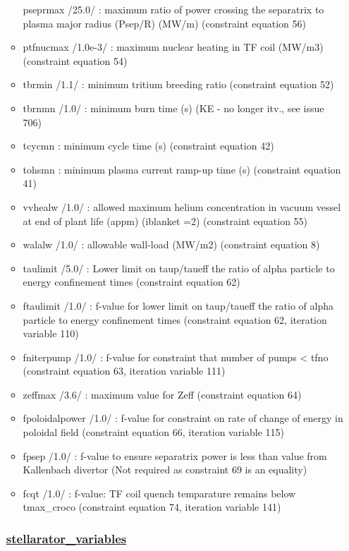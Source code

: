 \documentclass[]{article}
\begin{document}
\begin{itemize}
\begin{itemize}
    pseprmax /25.0/ : maximum ratio of power crossing the separatrix to
    plasma major radius (Psep/R) (MW/m) (constraint equation 56)
  \item
    ptfnucmax /1.0e-3/ : maximum nuclear heating in TF coil (MW/m3)
    (constraint equation 54)
  \item
    tbrmin /1.1/ : minimum tritium breeding ratio (constraint equation
    52)
  \item
    tbrnmn /1.0/ : minimum burn time (s) (KE - no longer itv., see issue
    706)
  \item
    tcycmn : minimum cycle time (s) (constraint equation 42)
  \item
    tohsmn : minimum plasma current ramp-up time (s) (constraint
    equation 41)
  \item
    vvhealw /1.0/ : allowed maximum helium concentration in vacuum
    vessel at end of plant life (appm) (iblanket =2) (constraint
    equation 55)
  \item
    walalw /1.0/ : allowable wall-load (MW/m2) (constraint equation 8)
  \item
    taulimit /5.0/ : Lower limit on taup/taueff the ratio of alpha
    particle to energy confinement times (constraint equation 62)
  \item
    ftaulimit /1.0/ : f-value for lower limit on taup/taueff the ratio
    of alpha particle to energy confinement times (constraint equation
    62, iteration variable 110)
  \item
    fniterpump /1.0/ : f-value for constraint that number of pumps
    \textless{} tfno (constraint equation 63, iteration variable 111)
  \item
    zeffmax /3.6/ : maximum value for Zeff (constraint equation 64)
  \item
    fpoloidalpower /1.0/ : f-value for constraint on rate of change of
    energy in poloidal field (constraint equation 66, iteration variable
    115)
  \item
    fpsep /1.0/ : f-value to ensure separatrix power is less than value
    from Kallenbach divertor (Not required as constraint 69 is an
    equality)
  \item
    fcqt /1.0/ : f-value: TF coil quench temparature remains below
    tmax\_croco (constraint equation 74, iteration variable 141)
  \end{itemize}

  \subsubsection{\texorpdfstring{\href{stellarator_variables.html}{stellarator\_variables}}{stellarator\_variables}}\label{stellarator_variables}


\end{itemize}
\end{document}
